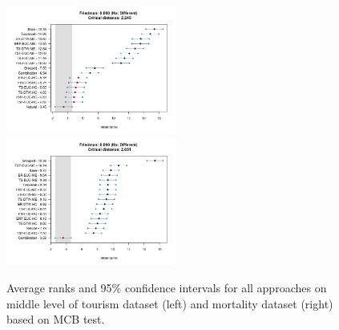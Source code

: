 \documentclass[12pt]{article}
\begin{document}
\begin{table}[!h]
\end{table}

\begin{figure}
\renewcommand\thefigure{S.1}
    \centering
    \includegraphics[width=0.5\textwidth]{../figures/FigureS1_tourism_mcb_combination_middle.jpg}
    \includegraphics[width=0.5\textwidth]{../figures/Figure12_mortality_mcb_combination.jpg}
    \caption{\label{fig:mcb_middle}Average ranks and 95\% confidence intervals for all approaches on middle level of tourism dataset (left) and mortality dataset (right) based on MCB test.}
\end{figure}
\end{document}
